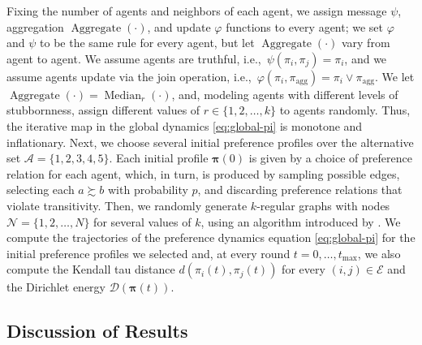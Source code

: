 \documentclass[conference]{ieeeconf}
\newcommand{\N}{\mathcal{N}}
\newcommand{\A}{\mathcal{A}}
\newcommand{\E}{\mathcal{E}}
\newcommand{\D}{\mathcal{D}}
\newcommand{\prefers}{\succsim}
\newcommand{\profile}{\boldsymbol{\pi}}
\newcommand{\join}{\vee}
\DeclareMathOperator{\Aggregate}{Aggregate}
\DeclareMathOperator{\Median}{Median}
\begin{document}
 Fixing the number of agents and neighbors of each agent, we assign message $\psi$, aggregation $\Aggregate(\cdot)$, and update $\varphi$ functions to every agent; we set $\varphi$ and $\psi$ to be the same rule for every agent, but let $\Aggregate(\cdot)$ vary from agent to agent. We assume agents are truthful, i.e.,~$\psi(\pi_i,\pi_j) = \pi_i$, and we assume agents update via the join operation, i.e.,~$\varphi(\pi_i,\pi_{\mathrm{agg}}) = \pi_i \join \pi_{\mathrm{agg}}$. We let $\Aggregate(\cdot) = \Median_r(\cdot)$, and, modeling agents with different levels of stubbornness, assign different values of $r \in \{1,2,\dots,k\}$ to agents randomly. Thus, the iterative map in the global dynamics \eqref{eq:global-pi} is monotone and inflationary. Next, we choose several initial preference profiles over the alternative set $\A = \{1,2,3,4,5\}$. Each initial profile $\profile(0)$ is given by a choice of preference relation for each agent, which, in turn, is produced by sampling possible edges, selecting each $a \prefers b$ with probability $p$, and discarding preference relations that violate transitivity. Then, we randomly generate $k$-regular graphs with nodes $\N = \{1,2,\dots,N\}$ for several values of $k$, using an algorithm introduced by \cite{kim2003}. We compute the trajectories of the preference dynamics equation \eqref{eq:global-pi} for the initial preference profiles we selected and, at every round $t=0, \dots, t_{\max}$,  we also compute the Kendall tau distance $d\left(\pi_i(t),\pi_j(t)\right)$ for every $(i,j) \in \E$ and the Dirichlet energy $\D\left( \profile(t) \right)$.



\vspace{-0.25em}
\subsection{Discussion of Results}
\vspace{-0.25em}
\end{document}
